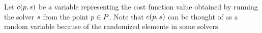 
Let $c(p, s)$ be a variable representing the cost function value obtained by running the solver $s$ from the point $p \in P$. Note that $c(p, s)$ can be thought of as a random variable because of the randomized elements in some solvers. 

